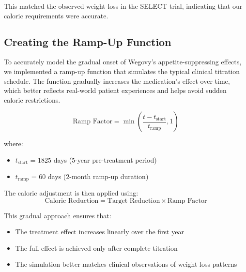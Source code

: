 This matched the observed weight loss in the SELECT trial, indicating that our caloric requirements were accurate.

\subsection{Creating the Ramp-Up Function}
To accurately model the gradual onset of Wegovy's appetite-suppressing effects, we implemented a ramp-up function that simulates the typical clinical titration schedule. The function gradually increases the medication's effect over time, which better reflects real-world patient experiences and helps avoid sudden caloric restrictions.

\begin{equation}
    \text{Ramp Factor} = \min\left(\frac{t - t_{\text{start}}}{t_{\text{ramp}}}, 1\right)
\end{equation}

where:
\begin{itemize}
    \item $t_{\text{start}}$ = 1825 days (5-year pre-treatment period)
    \item $t_{\text{ramp}}$ = 60 days (2-month ramp-up duration)
\end{itemize}

The caloric adjustment is then applied using:
\begin{equation}
    \text{Caloric Reduction} = \text{Target Reduction} \times \text{Ramp Factor}
\end{equation}

This gradual approach ensures that:
\begin{itemize}
    \item The treatment effect increases linearly over the first year
    \item The full effect is achieved only after complete titration
    \item The simulation better matches clinical observations of weight loss patterns
\end{itemize}


